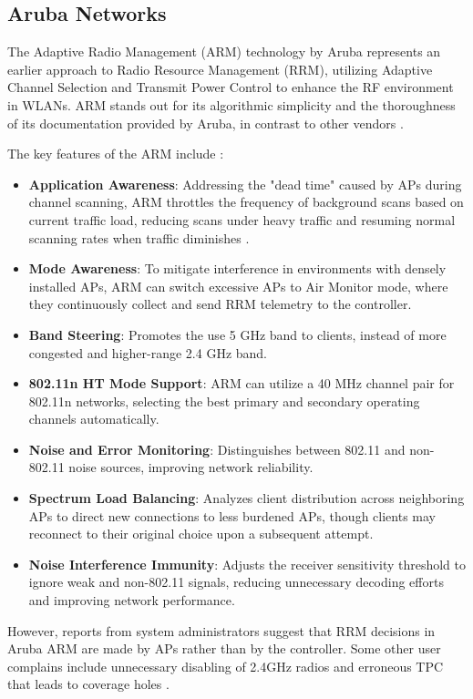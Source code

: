 \subsection{Aruba Networks}
The Adaptive Radio Management (ARM) technology by Aruba represents an earlier approach to Radio Resource Management (RRM), utilizing Adaptive Channel Selection and Transmit Power Control to enhance the RF environment in WLANs. ARM stands out for its algorithmic simplicity and the thoroughness of its documentation provided by Aruba, in contrast to other vendors \cite{ArubaOSUserGuide}.

The key features of the ARM include \cite{ARMOverview}:
\begin{itemize}
\item \textbf{Application Awareness}: Addressing the "dead time" caused by APs during channel scanning, ARM throttles the frequency of background scans based on current traffic load, reducing scans under heavy traffic and resuming normal scanning rates when traffic diminishes \cite{UnderstandingARM}.
\item \textbf{Mode Awareness}: To mitigate interference in environments with densely installed APs, ARM can switch excessive APs to Air Monitor mode, where they continuously collect and send RRM telemetry to the controller.
\item \textbf{Band Steering}: Promotes the use 5 GHz band to clients, instead of more congested and higher-range 2.4 GHz band.
\item \textbf{802.11n HT Mode Support}: ARM can utilize a 40 MHz channel pair for 802.11n networks, selecting the best primary and secondary operating channels automatically.
\item \textbf{Noise and Error Monitoring}: Distinguishes between 802.11 and non-802.11 noise sources, improving network reliability.
\item \textbf{Spectrum Load Balancing}: Analyzes client distribution across neighboring APs to direct new connections to less burdened APs, though clients may reconnect to their original choice upon a subsequent attempt.
\item \textbf{Noise Interference Immunity}: Adjusts the receiver sensitivity threshold to ignore weak and non-802.11 signals, reducing unnecessary decoding efforts and improving network performance.
\end{itemize}

However, reports from system administrators suggest that RRM decisions in Aruba ARM are made by APs rather than by the controller. Some other user complains include unnecessary disabling of 2.4GHz radios and erroneous TPC that leads to coverage holes \cite{TamingArubaARM2012}.

